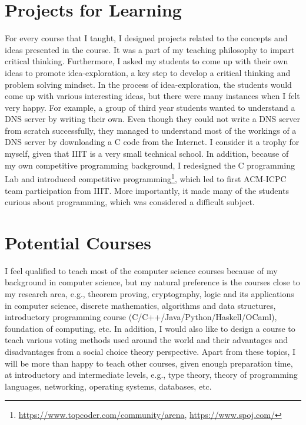 \documentclass[a4paper]{article}
\begin{document}
\section{Projects for Learning}
For every course that I taught, I designed projects related to the concepts 
and ideas presented in the course. It was a part of my teaching philosophy to impart 
critical thinking. Furthermore, I asked my students to come up with their own ideas to 
promote idea-exploration, a key step to develop a critical thinking and problem solving mindset. 
In the process of idea-exploration, the students would come up with various interesting 
ideas, but there were many instances when I felt very happy. For example, a group of third year students  
wanted to understand a DNS server by writing their own. Even though they 
could not write a DNS server from scratch successfully, they managed to understand 
most of the workings of a DNS server by downloading a C code from the Internet. 
I consider it a trophy for myself, given that IIIT is a very small technical school. 
In addition, because of my own 
competitive programming background, 
I redesigned the C programming Lab and introduced competitive 
programming\footnote{\url{https://www.topcoder.com/community/arena}, 
\url{https://www.spoj.com/}}, which led to first ACM-ICPC team participation 
from IIIT. More importantly, it made many of the students curious about 
programming, which was considered a difficult subject.

\section{Potential Courses}
I feel qualified to teach most of the computer science courses 
because of my background in computer science, but 
my natural preference is the courses close to my research 
area, e.g., theorem proving, cryptography, logic 
and its applications in computer science, discrete 
mathematics, algorithms and data structures, 
introductory programming course (C/C++/Java/Python/Haskell/OCaml),
foundation of computing, etc. 
In addition, I would also like to design a course to teach 
various voting methods used around the world and 
their advantages and disadvantages from a social choice theory perspective. 
Apart from these topics, I will 
be more than happy to teach other courses, given enough 
preparation time, at introductory and 
intermediate levels, e.g., type theory, theory of programming 
languages, networking, operating systems, databases, etc.

 
\end{document}
